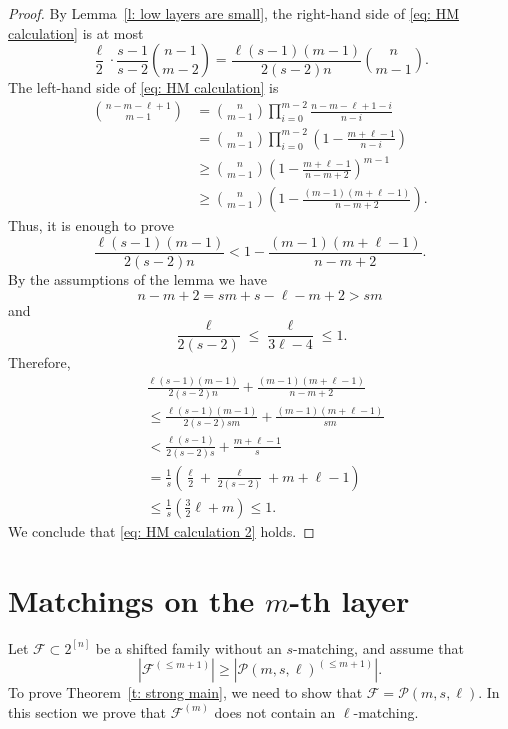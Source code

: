 \documentclass{article}
\begin{document}
\begin{proof}
    By Lemma~\ref{l: low layers are small}, the right-hand side of \eqref{eq: HM calculation} is at most
    \[
    \frac{\ell}{2}\cdot\frac{s-1}{s-2}{n - 1 \choose m - 2}
    = \frac{\ell(s-1)(m-1)}{2(s-2)n}{n \choose m - 1}.
    \]
    The left-hand side of \eqref{eq: HM calculation} is
    \begin{align*}
        {n - m - \ell + 1 \choose m - 1}
        &= {n \choose m - 1}\prod_{i=0}^{m-2}\frac{n-m-\ell+1-i}{n-i} \\
        &= {n \choose m - 1}\prod_{i=0}^{m-2}\left(1-\frac{m+\ell-1}{n-i}\right) \\
        &\geq {n \choose m - 1} \left(1-\frac{m+\ell-1}{n-m+2} \right)^{m-1} \\
        &\geq {n \choose m - 1}\left(1 - \frac{(m-1)(m+\ell-1)}{n-m+2} \right).
    \end{align*}
    Thus, it is enough to prove
    \begin{equation} \label{eq: HM calculation 2}
        \frac{\ell(s-1)(m-1)}{2(s-2)n} < 1 - \frac{(m-1)(m+\ell-1)}{n-m+2}.
    \end{equation}
    By the assumptions of the lemma we have
    \[
    n - m + 2 = sm + s - \ell - m + 2 > sm
    \]
    and
    \[
    \frac{\ell}{2(s-2)} \leq \frac{\ell}{3\ell-4} \leq 1.
    \]
    Therefore,
{\small
    \begin{align*}
        &\frac{\ell(s-1)(m-1)}{2(s-2)n} + \frac{(m-1)(m+\ell-1)}{n-m+2} \\
        &\leq \frac{\ell(s-1)(m-1)}{2(s-2)sm} + \frac{(m-1)(m+\ell-1)}{sm} \\
        &< \frac{\ell(s-1)}{2(s-2)s} + \frac{m+\ell-1}{s} \\
        &= \frac{1}{s}\left(\frac{\ell}{2} + \frac{\ell}{2(s-2)} + m + \ell - 1\right) \\
        &\leq \frac{1}{s}\left(\frac{3}{2}\ell + m\right) \leq 1.
    \end{align*}
}
    We conclude that \eqref{eq: HM calculation 2} holds.
\end{proof}

\section{Matchings on the $m$-th layer}

Let $\mathcal{F} \subset 2^{[n]}$ be a shifted family without an $s$-matching, and assume that
\[
|\mathcal{F}^{(\leq m + 1)}| \geq |\mathcal{P}(m, s, \ell)^{(\leq m + 1)}|.
\]
To prove Theorem~\ref{t: strong main}, we need to show that $\mathcal{F} = \mathcal{P}(m, s, \ell)$. In this section we prove that $\mathcal{F}^{(m)}$ does not contain an $\ell$-matching.
\end{document}
